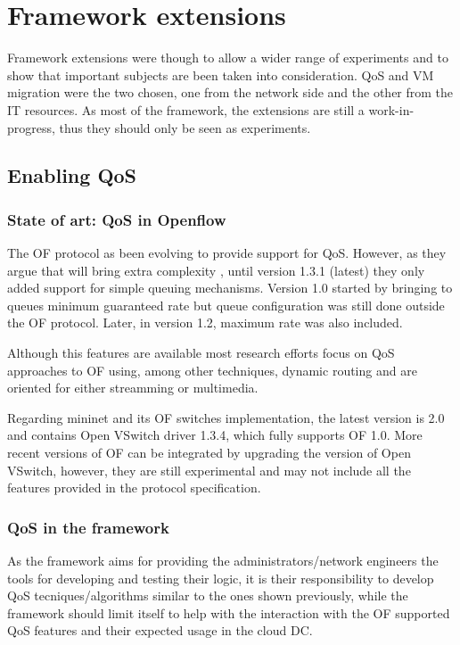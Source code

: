 \documentclass[12pt,english,oneside]{book}
\begin{document}
\section{Framework extensions \label{Sec:fraext} }
\hspace{0.6cm}

Framework extensions were though to allow a wider range of experiments and to show that important subjects are been taken into consideration. QoS and VM migration were the two chosen, one from the network side and the other from the IT resources.
As most of the framework, the extensions are still a work-in-progress, thus they should only be seen as experiments.

\subsection{Enabling QoS}
\subsubsection{State of art: QoS in Openflow}
\hspace{0.6cm}

The OF protocol as been evolving to provide support for QoS.
However, as they argue that will bring extra complexity \cite{qosof}, until version 1.3.1 (latest) they only added support for simple queuing mechanisms.
Version 1.0 started by bringing to queues minimum guaranteed rate but queue configuration was still done outside the OF protocol. Later, in version 1.2, maximum rate was also included.

Although this features are available most research efforts focus on QoS approaches to OF using, among other techniques, dynamic routing and are oriented for either streamming\cite{ofqos2}\cite{ofqos3} or multimedia\cite{ofqos1}.

Regarding mininet and its OF switches implementation, the latest version is 2.0 and contains Open VSwitch driver 1.3.4, which fully supports OF 1.0.
More recent versions of OF can be integrated by upgrading the version of Open VSwitch, however, they are still experimental and may not include all the features provided in the protocol specification.

\subsubsection{QoS in the framework}
\hspace{0.6cm}

As the framework aims for providing the administrators/network engineers the tools for developing and testing their logic, it is their responsibility to develop QoS tecniques/algorithms similar to the ones shown previously, while the framework should limit itself to help with the interaction with the OF supported QoS features and their expected usage in the cloud DC.
\end{document}
